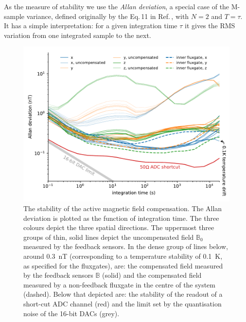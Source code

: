 As the measure of stability we use the \emph{Allan deviation}, a special case of the M-sample variance, defined originally by the Eq.\,11 in Ref.\,\cite{Allan1966}, with $N=2$ and $T = \tau$.
It has a simple interpretation: for a given integration time $\tau$ it gives the RMS variation from one integrated sample to the next.

\begin{figure}
  \centering
  \includegraphics[width=\linewidth]{gfx/prototype/run8_field_stability.pdf}
  \caption{The stability of the active magnetic field compensation. The Allan deviation is plotted as the function of integration time. The three colours depict the three spatial directions. The uppermost three groups of thin, solid lines depict the uncompensated field $\mathbb{B}_0$ measured by the feedback sensors. In the dense group of lines below, around \SI{0.3}{\nano\tesla} (corresponding to a temperature stability of \SI{0.1}{\kelvin}, as specified for the fluxgates), are: the compensated field measured by the feedback sensors $\mathbb{B}$ (solid) and the compensated field measured by a non-feedback fluxgate in the centre of the system (dashed).
  Below that depicted are: the stability of the readout of a short-cut ADC channel (red) and the limit set by the quantisation noise of the 16-bit DACs (grey).}\label{fig:prototype_stability}
\end{figure}

